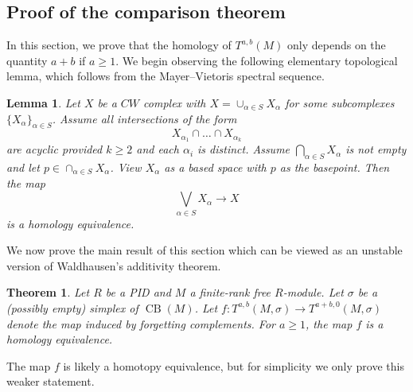 \documentclass[a4paper]{amsart}
\DeclareMathOperator{\CB}{CB}
\newcommand{\m}{\to}
\numberwithin{theoremcounter}{section}
\newtheorem{theorem}[theoremauto]{Theorem}
\newtheorem{lemma}[lemmaauto]{Lemma}
\theoremstyle{definition}
\theoremstyle{remark}
\begin{document}
\subsection{Proof of the comparison theorem}


In this section, we prove that the homology of $T^{a,b}(M)$ only depends on the quantity $a+b$ if $a \geq 1$. We begin observing the following elementary topological lemma, which follows from the Mayer--Vietoris spectral sequence. 

\begin{lemma} \label{LemmaWedge}
Let $X$ be a $CW$ complex with $X=\cup_{\alpha \in S} X_\alpha$ for some subcomplexes $\{X_{\alpha}\}_{\alpha \in S}$.  Assume all intersections of the form $$X_{\alpha_1} \cap \dots \cap X_{\alpha_k}$$ are acyclic provided $k \geq 2$ and each $\alpha_i$ is distinct. Assume $\bigcap_{\alpha \in S} X_{\alpha}$ is not empty and let $p \in \cap_{\alpha \in S} X_{\alpha}$. View $X_\alpha$ as a based space with $p$ as the basepoint. Then the map $$\bigvee_{\alpha \in S} X_\alpha \m X $$ is a homology equivalence.
\end{lemma}


We now prove the main result of this section which can be viewed as an unstable version of Waldhausen's additivity theorem. 


\begin{theorem} \label{SplitvsNotSplit}
Let $R$ be a PID and $M$ a finite-rank free $R$-module. Let $\sigma$ be a (possibly empty) simplex of ${\CB}(M)$. Let $f\colon T^{a,b}(M, \sigma) \m T^{a+b,0}(M, \sigma)$ denote the map induced by forgetting complements. 
For $a\geq 1$, the map $f$ is a homology equivalence. 
\end{theorem}

The map $f$ is likely a homotopy equivalence, but for simplicity we only prove this weaker statement. 
\end{document}
